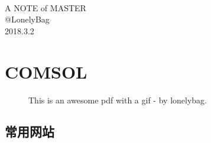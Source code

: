 \documentclass[UTF8]{ctexbook}
\begin{document}
\begin{center}  %
    \quad \\
    \vspace{3cm}
    \hspace{3cm}\Huge{A NOTE of MASTER}\\
    \vspace{5cm}
    \hspace{3cm}\Large{@LonelyBag}\\
    \vspace{0.5cm}
    \hspace{3cm}\Large {2018.3.2}
    \clearpage  %
\end{center}

\thispagestyle{empty}
\clearpage  %

\tableofcontents

\section{COMSOL}
\begin{figure}[!htb]
	\centering
	\vspace{-0.3cm}
	\caption{This is an awesome pdf with a gif - by lonelybag.}\label{fig:1}
\end{figure}
\subsection{常用网站}
\end{document}
